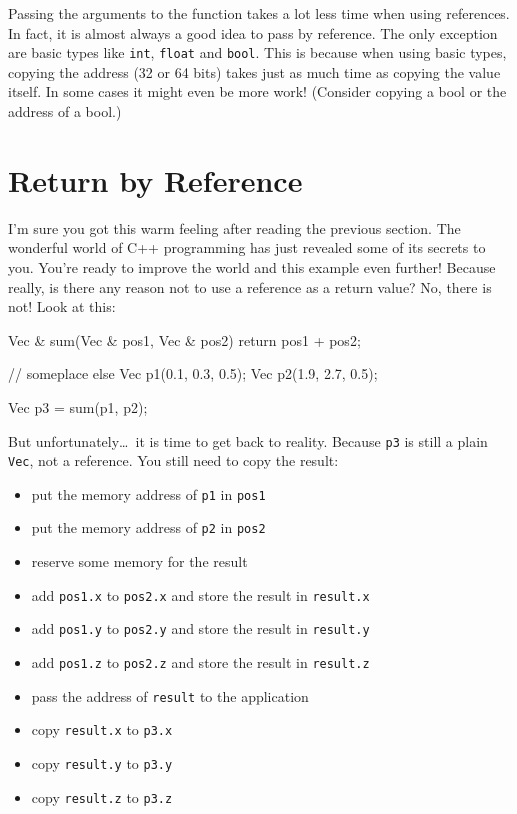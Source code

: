 Passing the arguments to the function takes a lot less time when using references. In fact, it is almost always a good idea to pass by reference. The only exception are basic types like \texttt{int}, \texttt{float} and \texttt{bool}. This is because when using basic types, copying the address (32 or 64 bits) takes just as much time as copying the value itself. In some cases it might even be more work! (Consider copying a bool or the address of a bool.)

\section{Return by Reference}
I'm sure you got this warm feeling after reading the previous section. The wonderful world of C++ programming has just revealed some of its secrets to you. You're ready to improve the world and this example even further! Because really, is there any reason not to use a reference as a return value? No, there is not! Look at this:

\begin{code}
Vec & sum(Vec & pos1, Vec & pos2) {
  return pos1 + pos2;
}

// someplace else
Vec p1(0.1, 0.3, 0.5);
Vec p2(1.9, 2.7, 0.5);

Vec p3 = sum(p1, p2); 
\end{code}

But unfortunately\ldots\ it is time to get back to reality. Because \texttt{p3} is still a plain \texttt{Vec}, not a reference. You still need to copy the result:

\begin{itemize}
\item put the memory address of \texttt{p1} in \texttt{pos1}
\item put the memory address of \texttt{p2} in \texttt{pos2}
\item reserve some memory for the result
\item add \texttt{pos1.x} to \texttt{pos2.x} and store the result in \texttt{result.x}
\item add \texttt{pos1.y} to \texttt{pos2.y} and store the result in \texttt{result.y}
\item add \texttt{pos1.z} to \texttt{pos2.z} and store the result in \texttt{result.z}
\item pass the address of \texttt{result} to the application
\item copy \texttt{result.x} to \texttt{p3.x}
\item copy \texttt{result.y} to \texttt{p3.y}
\item copy \texttt{result.z} to \texttt{p3.z}
\end{itemize}

